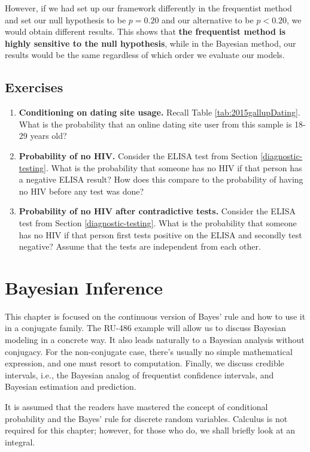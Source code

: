 \documentclass[]{book}
\theoremstyle{definition}
\theoremstyle{definition}
\theoremstyle{remark}
\begin{document}
However, if we had set up our framework differently in the frequentist
method and set our null hypothesis to be \(p = 0.20\) and our
alternative to be \(p < 0.20\), we would obtain different results. This
shows that \textbf{the frequentist method is highly sensitive to the
null hypothesis}, while in the Bayesian method, our results would be the
same regardless of which order we evaluate our models.

\section{Exercises}\label{exercises}

\begin{enumerate}
\def\labelenumi{\arabic{enumi}.}
\item
  \textbf{Conditioning on dating site usage.} Recall Table
  \ref{tab:2015gallupDating}. What is the probability that an online
  dating site user from this sample is 18-29 years old?
\item
  \textbf{Probability of no HIV.} Consider the ELISA test from Section
  \ref{diagnostic-testing}. What is the probability that someone has no
  HIV if that person has a negative ELISA result? How does this compare
  to the probability of having no HIV before any test was done?
\item
  \textbf{Probability of no HIV after contradictive tests.} Consider the
  ELISA test from Section \ref{diagnostic-testing}. What is the
  probability that someone has no HIV if that person first tests
  positive on the ELISA and secondly test negative? Assume that the
  tests are independent from each other.
\end{enumerate}

\chapter{Bayesian Inference}\label{bayesian-inference}

This chapter is focused on the continuous version of Bayes' rule and how
to use it in a conjugate family. The RU-486 example will allow us to
discuss Bayesian modeling in a concrete way. It also leads naturally to
a Bayesian analysis without conjugacy. For the non-conjugate case,
there's usually no simple mathematical expression, and one must resort
to computation. Finally, we discuss credible intervals, i.e., the
Bayesian analog of frequentist confidence intervals, and Bayesian
estimation and prediction.

It is assumed that the readers have mastered the concept of conditional
probability and the Bayes' rule for discrete random variables. Calculus
is not required for this chapter; however, for those who do, we shall
briefly look at an integral.
\end{document}
